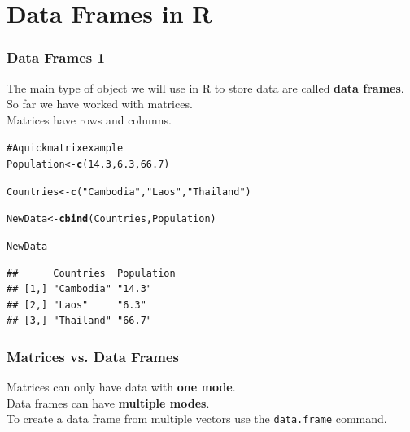 \documentclass{beamer}\usepackage{graphicx, color}
\makeatletter
\newcommand{\hlfunctioncall}[1]{\textcolor[rgb]{0.501960784313725,0,0.329411764705882}{\textbf{#1}}}%
\newcommand{\hlstring}[1]{\textcolor[rgb]{0.6,0.6,1}{#1}}%
\newcommand{\hlcomment}[1]{\textcolor[rgb]{0.180392156862745,0.6,0.341176470588235}{#1}}%
\newenvironment{kframe}{%
 \def\at@end@of@kframe{}%
 \ifinner\ifhmode%
  \def\at@end@of@kframe{\end{minipage}}%
  \begin{minipage}{\columnwidth}%
 \fi\fi%
 \def\FrameCommand##1{\hskip\@totalleftmargin \hskip-\fboxsep
 \colorbox{shadecolor}{##1}\hskip-\fboxsep
     \hskip-\linewidth \hskip-\@totalleftmargin \hskip\columnwidth}%
 \MakeFramed {\advance\hsize-\width
   \@totalleftmargin\z@ \linewidth\hsize
   \@setminipage}}%
 {\par\unskip\endMakeFramed%
 \at@end@of@kframe}
\newenvironment{knitrout}{}{} %
\makeatother
\begin{document}

\section{Data Frames in R}
\begin{frame}[fragile]
  \frametitle{Data Frames 1}
  The main type of object we will use in R to store data are called {\bf{data frames}}. \\[0.25cm]
  So far we have worked with matrices.\\[0.25cm]
  Matrices have rows and columns.
\end{frame}

\begin{frame}[fragile]
\begin{knitrout}
\color{fgcolor}\begin{kframe}
\begin{alltt}
\hlcomment{# A quick matrix example}
Population <- \hlfunctioncall{c}(14.3, 6.3, 66.7)

Countries <- \hlfunctioncall{c}(\hlstring{"Cambodia"}, \hlstring{"Laos"}, \hlstring{"Thailand"})

NewData <- \hlfunctioncall{cbind}(Countries, Population)

NewData
\end{alltt}
\begin{verbatim}
##      Countries  Population
## [1,] "Cambodia" "14.3"    
## [2,] "Laos"     "6.3"     
## [3,] "Thailand" "66.7"
\end{verbatim}
\end{kframe}
\end{knitrout}

\end{frame}


\begin{frame}[fragile]
  \frametitle{Matrices vs. Data Frames}
  Matrices can only have data with {\bf{one mode}}. \\[0.5cm]
  Data frames can have {\bf{multiple modes}}.\\[0.5cm]
  To create a data frame from multiple vectors use the \texttt{data.frame} command.
\end{frame}
\end{document}
